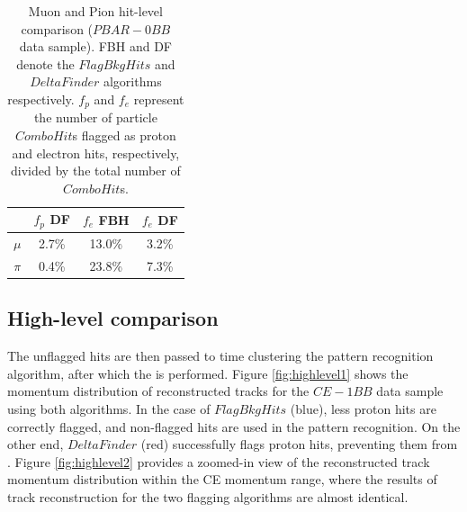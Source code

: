     \begin{center}
        \begin{table}[h!]
        \centering
        \renewcommand{\arraystretch}{1.}
        \begin{tabular}{| c | c | c | c|} 
        \hline
         &  $f_{p}$ DF &  $f_{e}$ FBH & $f_{e}$ DF\\
        \hline
        $\mu$  &  2.7\%  & 13.0\% & 3.2\%\\
        \hline
        $\pi$ & 0.4\% & 23.8\%& 7.3\%\\
        \hline
        \end{tabular}
        \caption{Muon and Pion 
        hit-level comparison ($PBAR-0BB$ data sample). FBH and DF denote 
        the $FlagBkgHits$ and $DeltaFinder$ algorithms respectively. $f_p$ and $f_e$ represent 
        the number of particle $ComboHit$s flagged as proton and electron hits, respectively, 
        divided by the total number of $ComboHit$s.}
        \label{tab:0bbpbar}
        \end{table}
        \end{center}

\subsection{High-level comparison}
The unflagged hits are then passed to  time clustering 
 the pattern recognition algorithm, 
after which the 
is performed. 
Figure \ref{fig:highlevel1} shows the momentum 
distribution of reconstructed tracks for the $CE-1BB$ 
data sample using both algorithms. 
In the case of $FlagBkgHits$ (blue), less proton hits are  
correctly flagged, and non-flagged hits are
used in the pattern recognition. 
On the other end, $DeltaFinder$ (red) successfully flags 
proton hits, preventing them from 
. 
Figure \ref{fig:highlevel2} provides a zoomed-in view 
of the reconstructed track momentum distribution within 
the CE momentum range, where the results of track reconstruction 
for the two flagging algorithms are almost identical.

